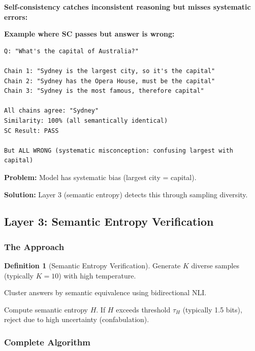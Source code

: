 \documentclass[12pt,a4paper]{article}
\theoremstyle{definition}
\newtheorem{definition}[theorem]{Definition}
\begin{document}
\begin{whybox}
\textbf{Self-consistency catches inconsistent reasoning but misses systematic errors:}

\textbf{Example where SC passes but answer is wrong:}

\begin{verbatim}
Q: "What's the capital of Australia?"

Chain 1: "Sydney is the largest city, so it's the capital"
Chain 2: "Sydney has the Opera House, must be the capital"
Chain 3: "Sydney is the most famous, therefore capital"

All chains agree: "Sydney"
Similarity: 100% (all semantically identical)
SC Result: PASS

But ALL WRONG (systematic misconception: confusing largest with capital)
\end{verbatim}

\textbf{Problem:} Model has systematic bias (largest city = capital).

\textbf{Solution:} Layer 3 (semantic entropy) detects this through sampling diversity.
\end{whybox}

\subsection{Layer 3: Semantic Entropy Verification}

\subsubsection{The Approach}

\begin{definition}[Semantic Entropy Verification]
Generate $K$ diverse samples (typically $K=10$) with high temperature.

Cluster answers by semantic equivalence using bidirectional NLI.

Compute semantic entropy $H$. If $H$ exceeds threshold $\tau_H$ (typically 1.5 bits), reject due to high uncertainty (confabulation).
\end{definition}

\subsubsection{Complete Algorithm}
\end{document}
